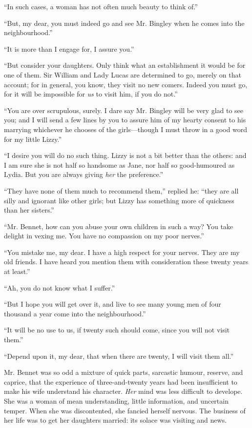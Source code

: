 \documentclass[12pt]{book}
\begin{document}
``In such cases, a woman has not often much beauty to think of.''

``But, my dear, you must indeed go and see Mr. Bingley when he comes into the neighbourhood.''

``It is more than I engage for, I assure you.''

``But consider your daughters. Only think what an establishment it would be for one of them. Sir William and Lady Lucas are determined to go, merely on that account; for in general, you know, they visit no new comers. Indeed you must go, for it will be impossible for \textit{us} to visit him, if you do not.''

``You are over scrupulous, surely. I dare say Mr. Bingley will be very glad to see you; and I will send a few lines by you to assure him of my hearty consent to his marrying whichever he chooses of the girls---though I must throw in a good word for my little Lizzy.''

``I desire you will do no such thing. Lizzy is not a bit better than the others: and I am sure she is not half so handsome as Jane, nor half so good-humoured as Lydia. But you are always giving \textit{her} the preference.''

``They have none of them much to recommend them,'' replied he: ``they are all silly and ignorant like other girls; but Lizzy has something more of quickness than her sisters.''

``Mr. Bennet, how can you abuse your own children in such a way? You take delight in vexing me. You have no compassion on my poor nerves.''

``You mistake me, my dear. I have a high respect for your nerves. They are my old friends. I have heard you mention them with consideration these twenty years at least.''

``Ah, you do not know what I suffer.''

``But I hope you will get over it, and live to see many young men of four thousand a year come into the neighbourhood.''

``It will be no use to us, if twenty such should come, since you will not visit them.''

``Depend upon it, my dear, that when there are twenty, I will visit them all.''

Mr. Bennet was so odd a mixture of quick parts, sarcastic humour, reserve, and caprice, that the experience of three-and-twenty years had been insufficient to make his wife understand his character. \textit{Her} mind was less difficult to develope. She was a woman of mean understanding, little information, and uncertain temper. When she was discontented, she fancied herself nervous. The business of her life was to get her daughters married: its solace was visiting and news.
\end{document}
